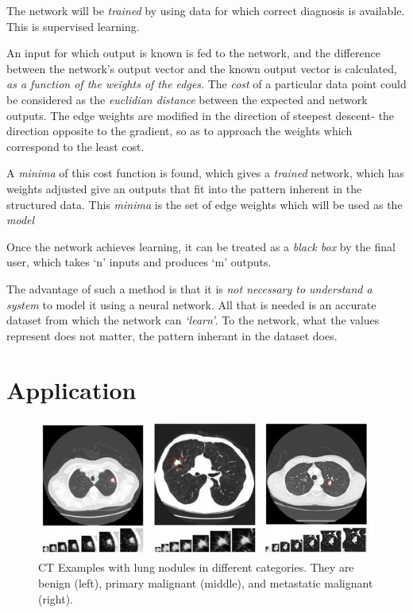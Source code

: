 \documentclass[11pt,a4paper]{article}
\begin{document}
The network will be \emph{trained} by using data for which correct diagnosis is available. This is supervised learning.

An input for which output is known is fed to the network, and the difference between the network's output vector and the known output vector is calculated, \emph{as a function of the weights of the edges}. The \emph{cost} of a particular data point could be considered as the \emph{euclidian distance} between the expected and network outputs. The edge weights are modified in the direction of steepest descent- the direction opposite to the gradient, so as to approach the weights which correspond to the least cost.\cite{3b1b}

A \emph{minima} of this cost function is found, which gives a \emph{trained} network, which has weights adjusted give an outputs that fit into the pattern inherent in the structured data. This \emph{minima} is the set of edge weights which will be used as the \emph{model}\cite{3b1b}

Once the network achieves learning, it can be treated as a \emph{black box} by the final user, which takes `n' inputs and produces `m' outputs.

The advantage of such a method is that it is \emph{not necessary to understand a system} to model it using a neural network. All that is needed is an accurate dataset from which the network can \emph{`learn'}. To the network, what the values represent does not matter, the pattern inherant in the dataset does.

\section{Application}
\begin{figure}
	\includegraphics[width=\linewidth]{cnnlung.jpg}
	\caption{CT Examples with lung nodules in different categories. They are benign (left), primary malignant (middle), and metastatic malignant (right).}
	\label{fig:cnn}
\end{figure}
\end{document}
